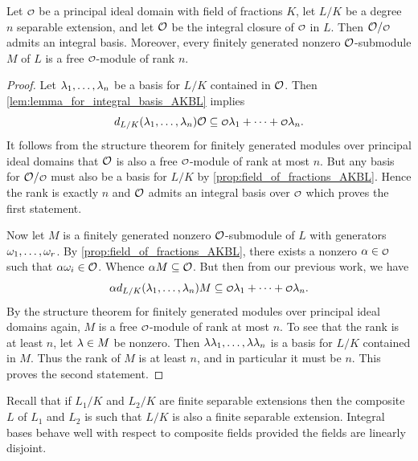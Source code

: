     \begin{theorem}\label{thm:integral_basis_AKBL}
      Let \(\smc{O}\) be a principal ideal domain with field of fractions \(K\), let \(L/K\) be a degree \(n\) separable extension, and let \(\mathcal{O}\) be the integral closure of \(\smc{O}\) in \(L\). Then \(\mc{O}/\smc{O}\) admits an integral basis. Moreover, every finitely generated nonzero \(\mathcal{O}\)-submodule \(M\) of \(L\) is a free \(\smc{O}\)-module of rank \(n\).
    \end{theorem}
    \begin{proof}
      Let \(\lambda_{1},\ldots,\lambda_{n}\) be a basis for \(L/K\) contained in \(\mathcal{O}\). Then \cref{lem:lemma_for_integral_basis_AKBL} implies
      \[
        d_{L/K}(\l_{1},\ldots,\l_{n})\mc{O} \subseteq \smc{O}\l_{1}+\cdots+\smc{O}\l_{n}.
      \]
      It follows from the structure theorem for finitely generated modules over principal ideal domains that \(\mathcal{O}\) is also a free \(\smc{O}\)-module of rank at most \(n\). But any basis for \(\mc{O}/\smc{O}\) must also be a basis for \(L/K\) by \cref{prop:field_of_fractions_AKBL}. Hence the rank is exactly \(n\) and \(\mathcal{O}\) admits an integral basis over \(\smc{O}\) which proves the first statement.
      
      Now let \(M\) is a finitely generated nonzero \(\mathcal{O}\)-submodule of \(L\) with generators \(\omega_{1},\ldots,\omega_{r}\). By \cref{prop:field_of_fractions_AKBL}, there exists a nonzero \(\a \in \smc{O}\) such that \(\alpha\omega_{i} \in \mathcal{O}\). Whence \(\alpha M \subseteq \mathcal{O}\). But then from our previous work, we have
      \[
        \a d_{L/K}(\l_{1},\ldots,\l_{n})M \subseteq \smc{O}\l_{1}+\cdots+\smc{O}\l_{n}.
      \]
      By the structure theorem for finitely generated modules over principal ideal domains again, \(M\) is a free \(\smc{O}\)-module of rank at most \(n\). To see that the rank is at least \(n\), let \(\lambda \in M\) be nonzero. Then \(\lambda\lambda_{1},\ldots,\lambda\lambda_{n}\) is a basis for \(L/K\) contained in \(M\). Thus the rank of \(M\) is at least \(n\), and in particular it must be \(n\). This proves the second statement.
    \end{proof}

    Recall that if \(L_{1}/K\) and \(L_{2}/K\) are finite separable extensions then the composite \(L\) of \(L_{1}\) and \(L_{2}\) is such that \(L/K\) is also a finite separable extension. Integral bases behave well with respect to composite fields provided the fields are linearly disjoint.

